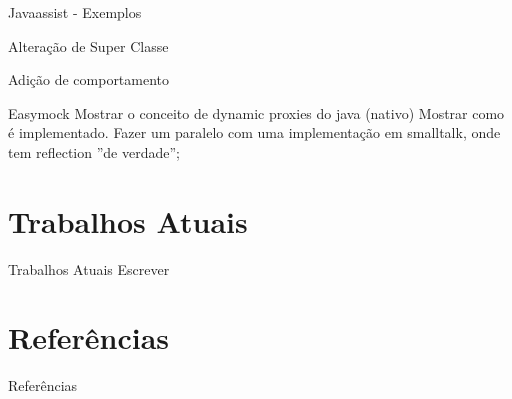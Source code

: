 \documentclass[12pt,t]{beamer}
\begin{document}
	 \begin{frame}{Javaassist - Exemplos}
 	 	\begin{exampleblock}{Alteração de Super Classe}
 	 		
 	 	\end{exampleblock}
 	 	\pause
 	 	\begin{exampleblock}{Adição de comportamento}
 	 		
 	 	\end{exampleblock}
	 \end{frame}
	 \begin{frame}{Easymock}
	 	Mostrar o conceito de dynamic proxies do java (nativo)
	 	Mostrar como é implementado. 
	 	Fazer um paralelo com uma implementação em smalltalk, onde tem reflection ''de verdade'';
	 \end{frame}
 \section{Trabalhos Atuais}	 
 \begin{frame}{Trabalhos Atuais}
 	\alert{Escrever}
 \end{frame}
 \section{Referências}
 \begin{frame}[allowframebreaks]{Referências}
   
  \end{frame}
\end{document}
